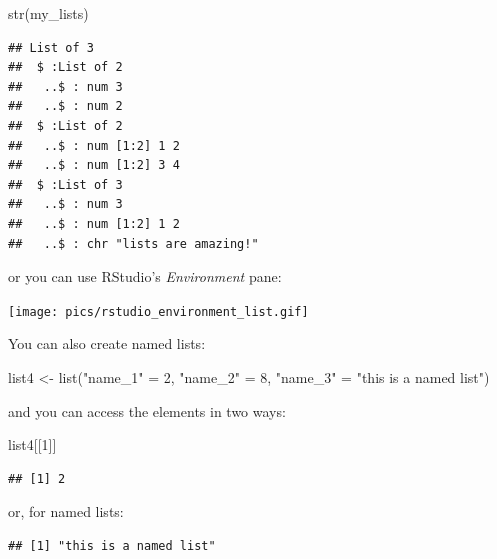 \documentclass[
]{article}
\newenvironment{Shaded}{\begin{snugshade}}{\end{snugshade}}
\newcommand{\DecValTok}[1]{\textcolor[rgb]{0.00,0.00,0.81}{#1}}
\newcommand{\FunctionTok}[1]{\textcolor[rgb]{0.00,0.00,0.00}{#1}}
\newcommand{\NormalTok}[1]{#1}
\newcommand{\OtherTok}[1]{\textcolor[rgb]{0.56,0.35,0.01}{#1}}
\newcommand{\SpecialCharTok}[1]{\textcolor[rgb]{0.00,0.00,0.00}{#1}}
\newcommand{\StringTok}[1]{\textcolor[rgb]{0.31,0.60,0.02}{#1}}
\begin{document}
\begin{Shaded}
\begin{Highlighting}[]
\FunctionTok{str}\NormalTok{(my\_lists)}
\end{Highlighting}
\end{Shaded}

\begin{verbatim}
## List of 3
##  $ :List of 2
##   ..$ : num 3
##   ..$ : num 2
##  $ :List of 2
##   ..$ : num [1:2] 1 2
##   ..$ : num [1:2] 3 4
##  $ :List of 3
##   ..$ : num 3
##   ..$ : num [1:2] 1 2
##   ..$ : chr "lists are amazing!"
\end{verbatim}

or you can use RStudio's \emph{Environment} pane:

\texttt{[image: pics/rstudio\_environment\_list.gif]}

You can also create named lists:

\begin{Shaded}
\begin{Highlighting}[]
\NormalTok{list4 }\OtherTok{\textless{}{-}} \FunctionTok{list}\NormalTok{(}\StringTok{"name\_1"} \OtherTok{=} \DecValTok{2}\NormalTok{, }\StringTok{"name\_2"} \OtherTok{=} \DecValTok{8}\NormalTok{, }\StringTok{"name\_3"} \OtherTok{=} \StringTok{"this is a named list"}\NormalTok{)}
\end{Highlighting}
\end{Shaded}

and you can access the elements in two ways:

\begin{Shaded}
\begin{Highlighting}[]
\NormalTok{list4[[}\DecValTok{1}\NormalTok{]]}
\end{Highlighting}
\end{Shaded}

\begin{verbatim}
## [1] 2
\end{verbatim}

or, for named lists:

\begin{Shaded}
\end{Shaded}

\begin{verbatim}
## [1] "this is a named list"
\end{verbatim}
\end{document}
